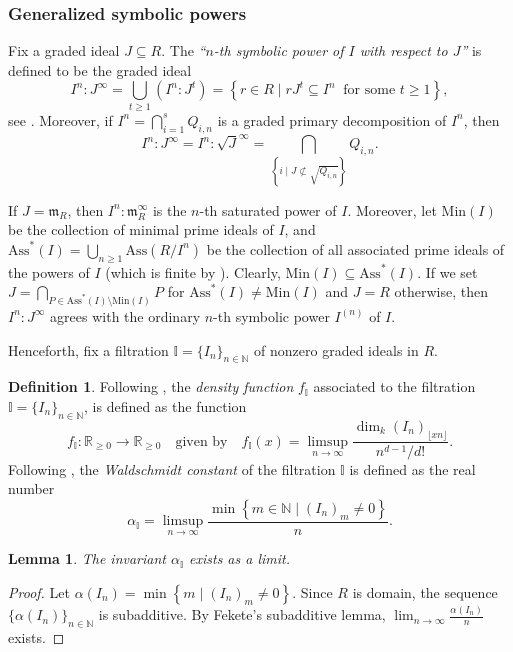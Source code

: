 \documentclass[12pt,a4paper]{amsart}
\theoremstyle{plain}
\newtheorem{lemma}[theorem]{Lemma}
\theoremstyle{definition}
\newtheorem{definition}[theorem]{Definition}
\numberwithin{equation}{theorem}
\newcommand{\mm}{\mathfrak{m}}
\begin{document}
\subsubsection{Generalized symbolic powers}\label{gen_symb}
Fix a graded ideal $J\subseteq R$. The \emph{``$n$-th symbolic power of $I$ with respect to $J$''} is defined to be the graded ideal $$I^n \colon J^{\infty} = \bigcup_{t\ge 1} \left(I^n \colon J^t\right) = \left\{r\in R \mid rJ^t \subseteq I^n\;\;\text{for some $t\ge 1$}\right\},$$ see \cite[Section 3]{HHT07}. Moreover, if $I^n = \bigcap_{i=1}^s Q_{i,n}$ is a graded primary decomposition of $I^n$, then $$I^n \colon J^{\infty} = I^n \colon {\sqrt{J}}^{\infty} = \bigcap_{\left\{i \mid J\not\subset \sqrt{Q_{i,n}}\right\}}Q_{i,n}.$$

If $J= \mm_R$, then $I^n \colon \mm_R^{\infty}$ is the $n$-th saturated power of $I$. Moreover, let $\mathrm{Min}(I)$ be the collection of minimal prime ideals of $I$, and $\mathrm{Ass}^*(I) = \bigcup_{n\ge 1}\mathrm{Ass}(R/I^n)$ be the collection of all associated prime ideals of the powers of $I$ (which is finite by \cite{Bro79}). Clearly, $\mathrm{Min}(I) \subseteq \mathrm{Ass}^*(I)$. If we set $J = \bigcap_{P\in \mathrm{Ass}^*(I)\setminus \mathrm{Min}(I)} P$ for $\mathrm{Ass}^*(I) \neq \mathrm{Min}(I)$ and $J = R$ otherwise, then $I^n \colon J^{\infty}$ agrees with the ordinary $n$-th symbolic power $I^{(n)}$ of $I$.

Henceforth, fix a filtration $\mathbb{I}=\{I_n\}_{n\in\mathbb{N}}$ of nonzero graded ideals in $R$.

\begin{definition}
Following \cite{DRT25}, the \emph{density function} $f_{\mathbb{I}}$ associated to the filtration $\mathbb{I}=\{I_n\}_{n\in\mathbb{N}}$, is defined as the function $$f_{\mathbb{I}} \colon \mathbb{R}_{\geq 0}\to\mathbb{R}_{\geq 0} \quad \text{given by}\quad f_{\mathbb{I}}(x) = \limsup_{n\to\infty}\dfrac{\dim_k {\left(I_n\right)}_{\lfloor xn \rfloor}}{n^{d-1}/d!}.$$ Following \cite{BCG+16}, the \emph{Waldschmidt constant} of the filtration $\mathbb{I}$ is defined as the real number $$\alpha_{\mathbb{I}} = \limsup_{n\to\infty}\dfrac{\min\left\{m\in\mathbb{N} \mid {\left(I_n\right)}_m\neq 0\right\}}{n}.$$
\end{definition}

\begin{lemma}
The invariant $\alpha_{\mathbb{I}}$ exists as a limit.
\end{lemma}
\begin{proof}
Let $\alpha(I_n) = \min\left\{m \mid {\left(I_n\right)}_m\neq 0\right\}$. Since $R$ is domain, the sequence $\{\alpha(I_n)\}_{n\in\mathbb{N}}$ is subadditive. By Fekete's subadditive lemma, $\lim_{n\to\infty}\frac{\alpha(I_n)}{n}$ exists.
\end{proof}
\end{document}
